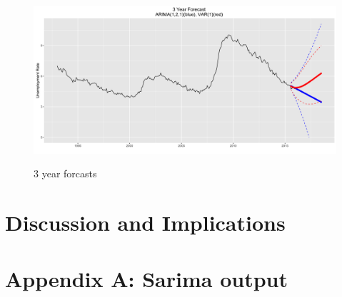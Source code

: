 \documentclass[twoside,twocolumn]{article}
\begin{document}
       \begin{figure}[H]
    	\centering
     	\caption{3 year forcasts}
     	\includegraphics[width=\linewidth]{images/forcast3}
     	\label{fig:forcasts2}
      \end{figure}

\section{Discussion and Implications}

\blindtext %


\begin{flushleft}
\end{flushleft}

\appendix
\section*{Appendix A: Sarima output} \label{App:AppendixA}
\end{document}
